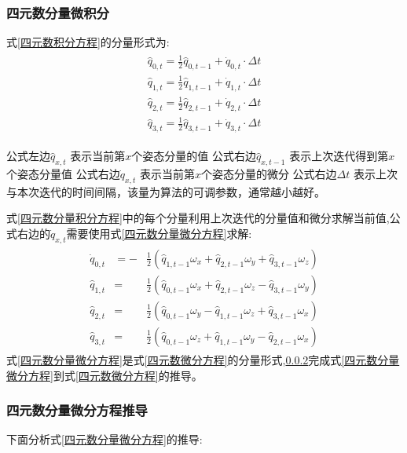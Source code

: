\documentclass[12pt,a4paper]{article}
\begin{document}
\subsubsection{四元数分量微积分}
式\ref{四元数积分方程}的分量形式为:
\begin{eqnarray}\label{四元数分量积分方程}
    \begin{split}
        \hat{q}_{0,t} = \frac{1}{2}\hat{q}_{0,t-1} + \dot{q}_{0,t} \cdot \Delta t \\ 
        \hat{q}_{1,t} = \frac{1}{2}\hat{q}_{1,t-1} + \dot{q}_{1,t} \cdot \Delta t \\
        \hat{q}_{2,t} = \frac{1}{2}\hat{q}_{2,t-1} + \dot{q}_{2,t} \cdot \Delta t \\
        \hat{q}_{3,t} = \frac{1}{2}\hat{q}_{3,t-1} + \dot{q}_{3,t} \cdot \Delta t
    \end{split}
\end{eqnarray} 

公式左边$\hat{q}_{x,t}$   表示当前第$x$个姿态分量的值
公式右边$\hat{q}_{x,t-1}$ 表示上次迭代得到第$x$个姿态分量值
公式右边$\dot{q}_{x,t}$   表示当前第$x$个姿态分量的微分
公式右边$\Delta t$        表示上次与本次迭代的时间间隔，该量为算法的可调参数，通常越小越好。

式\ref{四元数分量积分方程}中的每个分量利用上次迭代的分量值和微分求解当前值,公式右边的$\dot{q}_{x,t}$需要使用式\ref{四元数分量微分方程}求解:
\begin{eqnarray}\label{四元数分量微分方程}
    \begin{split}
        \dot{q}_{0,t}&=- &\frac{1}{2}(\hat{q}_{1,t-1}\omega_x+\hat{q}_{2,t-1}\omega_y+\hat{q}_{3,t-1}\omega_z) \\
        \hat{q}_{1,t}&=  &\frac{1}{2}(\hat{q}_{0,t-1}\omega_x+\hat{q}_{2,t-1}\omega_z-\hat{q}_{3,t-1}\omega_y) \\
        \hat{q}_{2,t}&=  &\frac{1}{2}(\hat{q}_{0,t-1}\omega_y-\hat{q}_{1,t-1}\omega_z+\hat{q}_{3,t-1}\omega_x) \\
        \hat{q}_{3,t}&=  &\frac{1}{2}(\hat{q}_{0,t-1}\omega_z+\hat{q}_{1,t-1}\omega_y-\hat{q}_{2,t-1}\omega_x)
    \end{split}
\end{eqnarray} 
式\ref{四元数分量微分方程}是式\ref{四元数微分方程}的分量形式,\ref{section:四元数分量微分方程推导}完成式\ref{四元数分量微分方程}到式\ref{四元数微分方程}的推导。
\subsubsection{四元数分量微分方程推导}\label{section:四元数分量微分方程推导}
下面分析式\ref{四元数分量微分方程}的推导:


\newpage
\renewcommand\refname{参考文献}
\centering %


\end{document}
